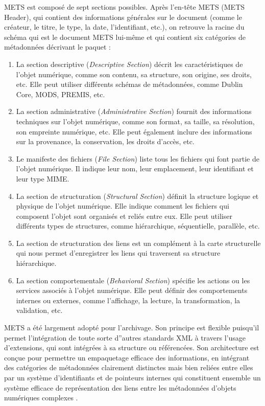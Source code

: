 \documentclass[12pt,a4paper]{article} %
\begin{document}
METS est composé de sept sections possibles. Après l'en-tête METS (METS Header), qui contient des informations générales sur le document (comme le créateur, le titre, le type, la date, l'identifiant, etc.), on retrouve la racine du schéma qui est le document METS lui-même et qui contient six catégories de métadonnées décrivant le paquet :
\begin{enumerate}
    \item La section descriptive (\textit{Descriptive Section}) décrit les caractéristiques de l'objet numérique, comme son contenu, sa structure, son origine, ses droits, etc. Elle peut utiliser différents schémas de métadonnées, comme Dublin Core, MODS, PREMIS, etc.
    \item La section administrative (\textit{Administrative Section}) fournit des informations techniques sur l'objet numérique, comme son format, sa taille, sa résolution, son empreinte numérique, etc. Elle peut également inclure des informations sur la provenance, la conservation, les droits d'accès, etc.
    \item Le manifeste des fichiers (\textit{File Section}) liste tous les fichiers qui font partie de l'objet numérique. Il indique leur nom, leur emplacement, leur identifiant et leur type MIME.
    \item La section de structuration (\textit{Structural Section}) définit la structure logique et physique de l'objet numérique. Elle indique comment les fichiers qui composent l'objet sont organisés et reliés entre eux. Elle peut utiliser différents types de structures, comme hiérarchique, séquentielle, parallèle, etc.
    \item La section de structuration des liens est un complément à la carte structurelle qui nous permet d'enregistrer les liens qui traversent sa structure hiérarchique.
    \item La section comportementale (\textit{Behavioral Section}) spécifie les actions ou les services associés à l'objet numérique. Elle peut définir des comportements internes ou externes, comme l'affichage, la lecture, la transformation, la validation, etc.
\end{enumerate}

METS a été largement adopté pour l'archivage. Son principe est flexible puisqu'il permet l'intégration de toute sorte d''autres standards XML à travers l'usage d'extensions, qui sont intégrées à sa structure ou référencées. Son architecture est conçue pour permettre un empaquetage efficace des informations, en intégrant des catégories de métadonnées clairement distinctes mais bien reliées entre elles par un système d'identifiants et de pointeurs internes qui constituent ensemble un système efficace de représentation des liens entre les métadonnées d'objets numériques complexes \autocite{gartner_metadata_2021}. 
\end{document}

